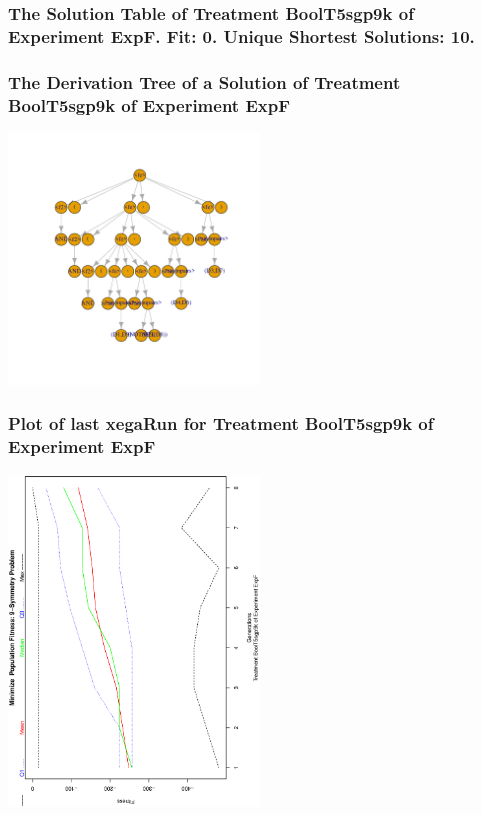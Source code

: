 \documentclass[18pt,c]{beamer}
\begin{document}
 \begin{frame}
 \fontsize{8pt}{9pt}\selectfont
 \frametitle{ The Solution Table of Treatment BoolT5sgp9k of Experiment ExpF. Fit: 0. Unique Shortest Solutions: 10. }

 \label{ExpFSolutionTable010.tex}  
 \end{frame}

 \begin{frame}
 \frametitle{ The Derivation Tree of a Solution of Treatment BoolT5sgp9k of Experiment ExpF }
 \begin{center}
\includegraphics[width=0.5\textwidth, angle=0]
{ExpFDerivationTreeFigure010.pdf}
 \end{center}
 \label{report/ExpFDerivationTreeFigure010.pdf}  
 \end{frame}

 \begin{frame}
 \frametitle{ Plot of last xegaRun for Treatment BoolT5sgp9k of Experiment ExpF }
 \begin{center}
\includegraphics[width=0.5\textwidth, angle=-90]
{ExpFPlotPopStatsFigure010.eps}
 \end{center}
 \label{report/ExpFPlotPopStatsFigure010.eps}  
 \end{frame}
\end{document}
